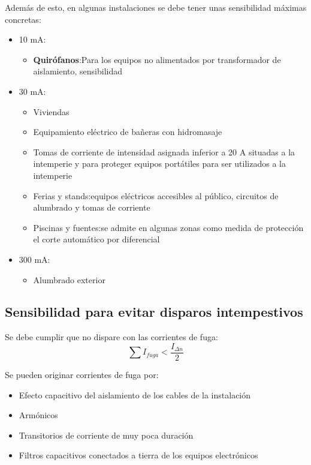 Además de esto, en algunas instalaciones se debe tener unas sensibilidad máximas concretas:
\begin{itemize}
	\item 10 mA:
	\begin{itemize}
		\item \textbf{Quirófanos}:Para los equipos no alimentados por transformador de aislamiento, sensibilidad
	\end{itemize}
	\item 30 mA:
	\begin{itemize}
		\item Viviendas
		\item Equipamiento eléctrico de bañeras con hidromasaje
		\item Tomas de corriente de intensidad asignada inferior a 20 A situadas a la intemperie y para proteger equipos portátiles para ser utilizados a la intemperie
		\item Ferias y stands:equipos eléctricos accesibles al público, circuitos de alumbrado y tomas de corriente
		\item Piscinas y fuentes:se admite en algunas zonas como medida de protección el corte automático por diferencial
	\end{itemize}
	\item 300 mA:
	\begin{itemize}
		\item Alumbrado exterior
	\end{itemize}
\end{itemize}
\subsection{Sensibilidad para evitar disparos intempestivos}
Se debe cumplir que no dispare con las corrientes de fuga:
\begin{equation}
	\sum I_{fuga} < \dfrac{I_{\Delta n}}{2}
\end{equation}

Se pueden originar corrientes de fuga por:
\begin{itemize}
	\item Efecto capacitivo del aislamiento de los cables de la instalación
	\item Armónicos
	\item Transitorios de corriente de muy poca duración
	\item Filtros capacitivos conectados a tierra de los equipos electrónicos
\end{itemize}

